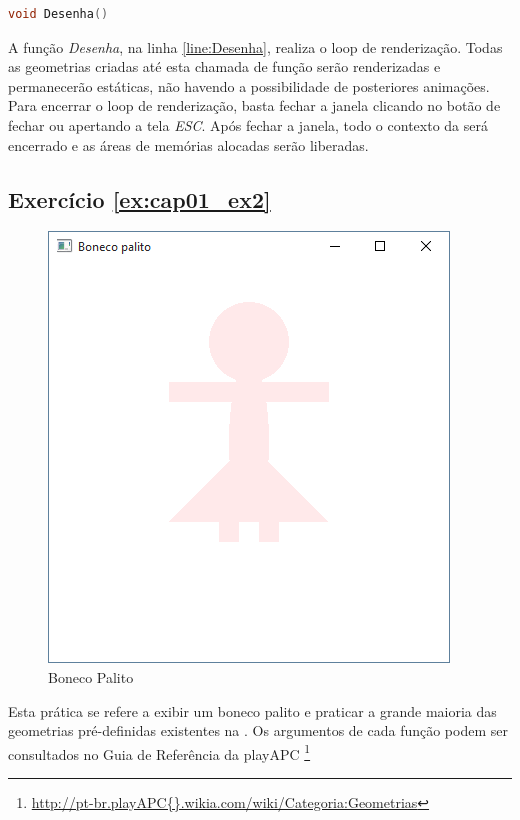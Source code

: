\begin{lstlisting}[label={func:Desenha},language=C++]
void Desenha()
\end{lstlisting}
A função \emph{Desenha}, na linha \ref{line:Desenha}, realiza o loop de renderização. Todas as geometrias criadas até esta chamada de função serão renderizadas e permanecerão estáticas, não havendo a possibilidade de posteriores animações.
Para encerrar o loop de renderização, basta fechar a janela clicando no botão de fechar ou apertando a tela \emph{ESC}. Após fechar a janela, todo o contexto da \playAPC{} será encerrado e as áreas de memórias alocadas serão liberadas.

\subsection*{Exercício \ref{ex:cap01_ex2}}
\begin{figure}[ht]
  \centerline{\includegraphics[width=.5\textwidth]{img/cap1_ex3.png}}
  \caption{Boneco Palito}
  \label{fig:cap01_ex2}
\end{figure}
Esta prática se refere a exibir um boneco palito e praticar a grande maioria das geometrias pré-definidas existentes na \playAPC{}. Os argumentos de cada função podem ser consultados no Guia de Referência da playAPC{} \footnote{\url{http://pt-br.playAPC{}.wikia.com/wiki/Categoria:Geometrias}}


